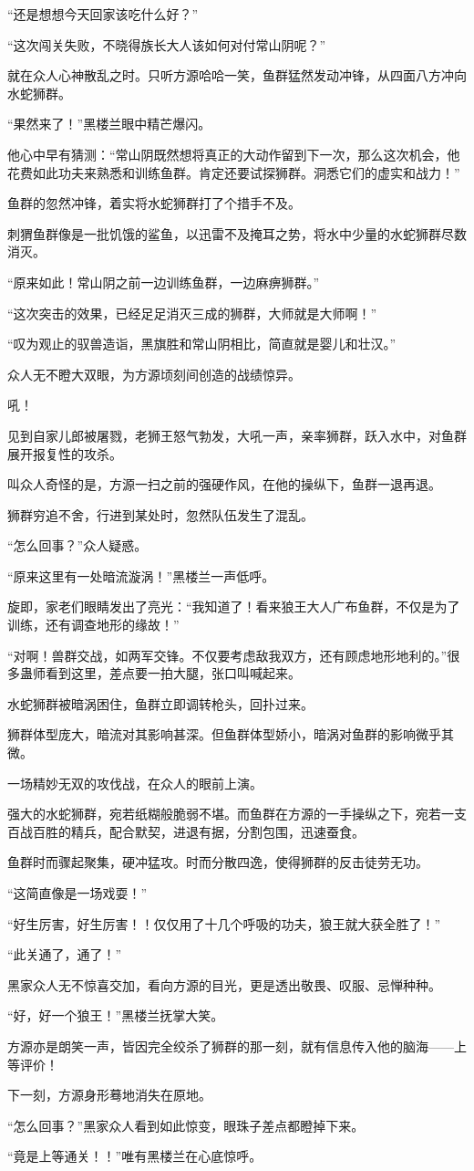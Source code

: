 \begin{this_body}
“还是想想今天回家该吃什么好？”

“这次闯关失败，不晓得族长大人该如何对付常山阴呢？”

就在众人心神散乱之时。只听方源哈哈一笑，鱼群猛然发动冲锋，从四面八方冲向水蛇狮群。

“果然来了！”黑楼兰眼中精芒爆闪。

他心中早有猜测：“常山阴既然想将真正的大动作留到下一次，那么这次机会，他花费如此功夫来熟悉和训练鱼群。肯定还要试探狮群。洞悉它们的虚实和战力！”

鱼群的忽然冲锋，着实将水蛇狮群打了个措手不及。

刺猬鱼群像是一批饥饿的鲨鱼，以迅雷不及掩耳之势，将水中少量的水蛇狮群尽数消灭。

“原来如此！常山阴之前一边训练鱼群，一边麻痹狮群。”

“这次突击的效果，已经足足消灭三成的狮群，大师就是大师啊！”

“叹为观止的驭兽造诣，黑旗胜和常山阴相比，简直就是婴儿和壮汉。”

众人无不瞪大双眼，为方源顷刻间创造的战绩惊异。

吼！

见到自家儿郎被屠戮，老狮王怒气勃发，大吼一声，亲率狮群，跃入水中，对鱼群展开报复性的攻杀。

叫众人奇怪的是，方源一扫之前的强硬作风，在他的操纵下，鱼群一退再退。

狮群穷追不舍，行进到某处时，忽然队伍发生了混乱。

“怎么回事？”众人疑惑。

“原来这里有一处暗流漩涡！”黑楼兰一声低呼。

旋即，家老们眼睛发出了亮光：“我知道了！看来狼王大人广布鱼群，不仅是为了训练，还有调查地形的缘故！”

“对啊！兽群交战，如两军交锋。不仅要考虑敌我双方，还有顾虑地形地利的。”很多蛊师看到这里，差点要一拍大腿，张口叫喊起来。

水蛇狮群被暗涡困住，鱼群立即调转枪头，回扑过来。

狮群体型庞大，暗流对其影响甚深。但鱼群体型娇小，暗涡对鱼群的影响微乎其微。

一场精妙无双的攻伐战，在众人的眼前上演。

强大的水蛇狮群，宛若纸糊般脆弱不堪。而鱼群在方源的一手操纵之下，宛若一支百战百胜的精兵，配合默契，进退有据，分割包围，迅速蚕食。

鱼群时而骤起聚集，硬冲猛攻。时而分散四逸，使得狮群的反击徒劳无功。

“这简直像是一场戏耍！”

“好生厉害，好生厉害！！仅仅用了十几个呼吸的功夫，狼王就大获全胜了！”

“此关通了，通了！”

黑家众人无不惊喜交加，看向方源的目光，更是透出敬畏、叹服、忌惮种种。

“好，好一个狼王！”黑楼兰抚掌大笑。

方源亦是朗笑一声，皆因完全绞杀了狮群的那一刻，就有信息传入他的脑海——上等评价！

下一刻，方源身形蓦地消失在原地。

“怎么回事？”黑家众人看到如此惊变，眼珠子差点都瞪掉下来。

“竟是上等通关！！”唯有黑楼兰在心底惊呼。

\end{this_body}

